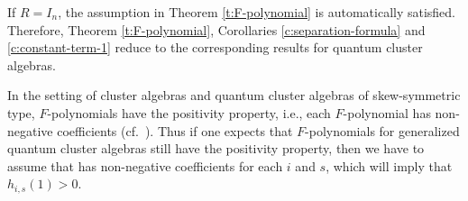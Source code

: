 \documentclass[pdftex]{sigma}
\numberwithin{equation}{section}
\begin{document}
\begin{Remark}
 If $R=I_n$, the assumption in Theorem \ref{t:F-polynomial} is automatically satisfied. Therefore, Theorem \ref{t:F-polynomial}, Corollaries \ref{c:separation-formula} and \ref{c:constant-term-1} reduce to the corresponding results for quantum cluster algebras.
\end{Remark}
\begin{Remark}
 In the setting of cluster algebras and quantum cluster algebras of skew-symmet\-ric type, $F$-polynomials have the positivity property, i.e., each $F$-polynomial has non-negative coefficients (cf.\ \cite{Davison18,GHKK2018}). Thus if one expects that $F$-polynomials for generalized quantum cluster algebras still have the positivity property, then we have to assume that  has non-negative coefficients for each $i$ and $s$, which will imply that $h_{i,s}(1)>0$.
\end{Remark}
\end{document}

